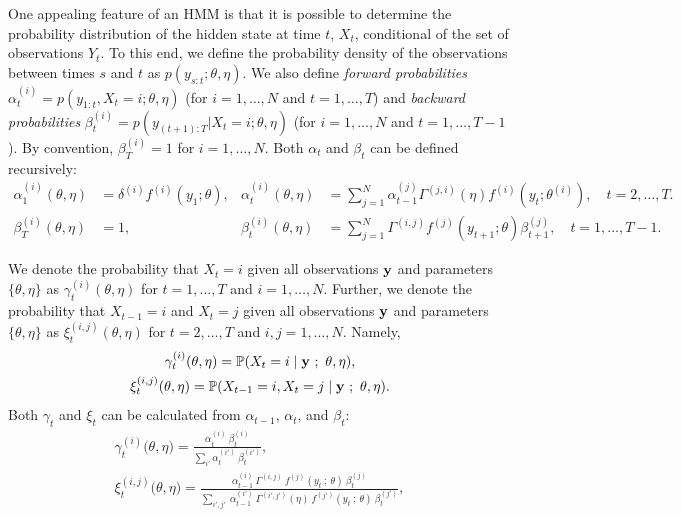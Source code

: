 One appealing feature of an HMM is that it is possible to determine the probability distribution of the hidden state at time $t$, $X_t$, conditional of the set of observations $Y_t$. To this end, we define the probability density of the observations between times $s$ and $t$ as $p(y_{s:t};\theta,\eta)$. We also define \textit{forward probabilities} $\alpha^{(i)}_t = p(y_{1:t},X_t = i;\theta,\eta)$ (for $i = 1,\ldots,N$ and $t = 1,\ldots,T$) and \textit{backward probabilities} $\beta^{(i)}_t = p(y_{(t+1):T}|X_t = i;\theta,\eta)$ (for $i = 1,\ldots,N$ and $t = 1,\ldots,T-1$). By convention, $\beta^{(i)}_T = 1$ for $i = 1,\ldots,N$. 
Both $\alpha_t$ and $\beta_t$ can be defined recursively:
%
\begin{align}
    \alpha_1^{(i)}(\theta,\eta) &= \delta^{(i)} f^{(i)}(y_1;\theta), & \alpha_t^{(i)}(\theta,\eta) &= \sum_{j=1}^N \alpha_{t-1}^{(j)} \Gamma^{(j,i)}(\eta) f^{(i)}(y_t;\theta^{(i)}), \quad t = 2,\ldots,T. \label{eqn:alpha} \\
    \beta_T^{(i)}(\theta,\eta) &= 1, & \beta_t^{(i)}(\theta,\eta) &= \sum_{j=1}^N \Gamma^{(i,j)} f^{(j)}(y_{t+1};\theta) \beta^{(j)}_{t+1}, \quad t = 1,\ldots,T-1. \label{eqn:beta}
\end{align}

We denote the probability that $X_t = i$ given all observations $\mathbf{y}$ and parameters $\{\theta,\eta\}$ as $\gamma_t^{(i)}(\theta,\eta)$ for $t = 1,\ldots,T$ and $i = 1,\ldots,N$. Further, we denote the probability that $X_{t-1} = i$ and $X_t = j$ given all observations $\mathbf{y}$ and parameters $\{\theta,\eta\}$ as $\xi_t^{(i,j)}(\theta,\eta)$ for $t = 2,\ldots,T$ and $i,j = 1,\ldots,N$. Namely,
%
\begin{gather*}
    \gamma_t^{(i)}(\theta,\eta) = \mathbb{P}(X_t = i \mid \mathbf{y} ~;~ \theta,\eta), \\ \xi_t^{(i,j)}(\theta,\eta) = \mathbb{P}(X_{t-1} = i, X_t = j \mid \mathbf{y} ~;~ \theta,\eta). \nonumber
\end{gather*}
%
Both $\gamma_t$ and $\xi_t$ can be calculated from $\alpha_{t-1}$, $\alpha_t$, and $\beta_t$:
%
\begin{gather}
    \gamma_{t}^{(i)}\big(\theta,\eta\big) = \frac{\alpha_{t}^{(i)} ~ \beta_{t}^{(i)}}{\sum_{i'} \alpha_{t}^{(i')} ~ \beta_{t}^{(i')}}, \label{eqn:gamma} \\
    \xi_{t}^{(i,j)}\big(\theta, \eta) = \frac{\alpha_{t-1}^{(i)} ~ \Gamma^{(i,j)} ~ f^{(j)}(y_{t} ~ ; ~\theta) ~ \beta_{t}^{(j)}}{\sum_{i',j'} ~ \alpha_{t-1}^{(i')} ~ \Gamma^{(i',j')}(\eta) ~ f^{(j')}(y_{t} ~ ; ~\theta) ~ \beta_{t}^{(j')}} \label{eqn:xi},
\end{gather}

